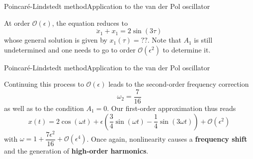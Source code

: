 \documentclass[usenames,dvipsnames,svgnames,10pt,aspectratio=169]{beamer}
\begin{document}
\begin{frame}[t, c]{Poincaré-Lindstedt method}{Application to the van der Pol oscillator}
  \begin{minipage}{.68\textwidth}
    At order $\mathcal{O}(\epsilon)$, the equation reduces to
    \[
    \ddot{x}_1 + x_1 =  2 \sin(3\tau)
    \]
    whose general solution is given by $x_1(\tau) = ??$.
    Note that $A_1$ is still undetermined and one needs to go to order $\mathcal{O}(\epsilon^2)$ to determine it.
  \end{minipage}%
  \hfill
  \begin{minipage}{.28\textwidth}
    \centering
  \end{minipage}

  \vspace{1cm}
\end{frame}

\begin{frame}[t, c]{Poincaré-Lindstedt method}{Application to the van der Pol oscillator}
  \begin{minipage}{.68\textwidth}
    Continuing this process to $\mathcal{O}(\epsilon)$ leads to the second-order frequency correction
    \[
    \omega_2 =  \dfrac{7}{16}
    \]
    as well as to the condition $A_1 = 0$.
    Our first-order approximation thus reads
    \[
    x(t) = 2 \cos(\omega t) + \epsilon \left( \dfrac{3}{4} \sin(\omega t) - \dfrac{1}{4} \sin(3\omega t) \right) + \mathcal{O}(\epsilon^2)
    \]
    with $\omega = 1 + \dfrac{7\epsilon^2}{16} + \mathcal{O}(\epsilon^4)$.
    Once again, nonlinearity causes a \alert{\textbf{frequency shift}} and the generation of \alert{\textbf{high-order harmonics}}.
  \end{minipage}%
  \hfill
  \begin{minipage}{.28\textwidth}
    \centering
  \end{minipage}

  \vspace{1cm}
\end{frame}
\end{document}
